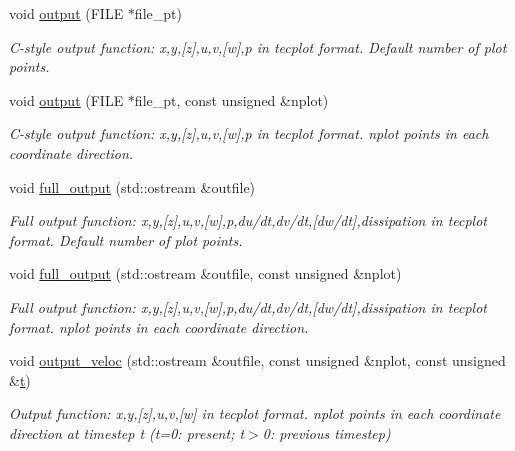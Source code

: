 \begin{DoxyCompactItemize}
void \hyperlink{classoomph_1_1GeneralisedNewtonianNavierStokesEquations_a0f56934ff2c1092a8e9bc457c93bf8cb}{output} (F\+I\+LE $\ast$file\+\_\+pt)
\begin{DoxyCompactList}\small\item\em C-\/style output function\+: x,y,\mbox{[}z\mbox{]},u,v,\mbox{[}w\mbox{]},p in tecplot format. Default number of plot points. \end{DoxyCompactList}\item 
void \hyperlink{classoomph_1_1GeneralisedNewtonianNavierStokesEquations_a4cea0e2de7ce23a994bda1ee87222d21}{output} (F\+I\+LE $\ast$file\+\_\+pt, const unsigned \&nplot)
\begin{DoxyCompactList}\small\item\em C-\/style output function\+: x,y,\mbox{[}z\mbox{]},u,v,\mbox{[}w\mbox{]},p in tecplot format. nplot points in each coordinate direction. \end{DoxyCompactList}\item 
void \hyperlink{classoomph_1_1GeneralisedNewtonianNavierStokesEquations_a37945b6f1c50cd8e559b9dadc131fb39}{full\+\_\+output} (std\+::ostream \&outfile)
\begin{DoxyCompactList}\small\item\em Full output function\+: x,y,\mbox{[}z\mbox{]},u,v,\mbox{[}w\mbox{]},p,du/dt,dv/dt,\mbox{[}dw/dt\mbox{]},dissipation in tecplot format. Default number of plot points. \end{DoxyCompactList}\item 
void \hyperlink{classoomph_1_1GeneralisedNewtonianNavierStokesEquations_a968a3921356d13d0e9be79a74fca032f}{full\+\_\+output} (std\+::ostream \&outfile, const unsigned \&nplot)
\begin{DoxyCompactList}\small\item\em Full output function\+: x,y,\mbox{[}z\mbox{]},u,v,\mbox{[}w\mbox{]},p,du/dt,dv/dt,\mbox{[}dw/dt\mbox{]},dissipation in tecplot format. nplot points in each coordinate direction. \end{DoxyCompactList}\item 
void \hyperlink{classoomph_1_1GeneralisedNewtonianNavierStokesEquations_afe07a58574ea59b9c83d33c96b92a98b}{output\+\_\+veloc} (std\+::ostream \&outfile, const unsigned \&nplot, const unsigned \&\hyperlink{cfortran_8h_af6f0bd3dc13317f895c91323c25c2b8f}{t})
\begin{DoxyCompactList}\small\item\em Output function\+: x,y,\mbox{[}z\mbox{]},u,v,\mbox{[}w\mbox{]} in tecplot format. nplot points in each coordinate direction at timestep t (t=0\+: present; t$>$0\+: previous timestep) \end{DoxyCompactList}\item 

\end{DoxyCompactItemize}

